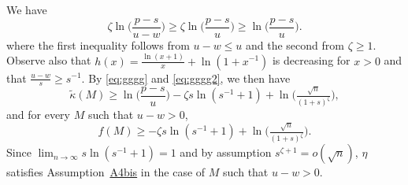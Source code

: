 \documentclass[
  12pt]{article}
\begin{document}
We have
\begin{equation}\label{eq:gggg2}
\zeta\ln\bigg(\frac{p-s}{u-w}\bigg) \geq \zeta\ln\bigg(\frac{p-s}{u}\bigg) \geq \ln\bigg(\frac{p-s}{u}\bigg).\end{equation}
where the first inequality follows from $u-w\leq u$ and the second from $\zeta\geq 1$.
Observe also that $h(x)= \frac{\ln(x+1)}{x}+\ln(1+{x}^{-1})$ is decreasing for $x>0$ and that $\frac{u-w}{s} \geq s^{-1}$. By \eqref{eq:gggg} and \eqref{eq:gggg2}, we then have 
\begin{equation*}
        \tilde{\kappa}(M) \geq \ln\big(\frac{p-s}{u}\big)-\zeta s\ln(s^{-1}+1)+ \ln \big(\tfrac{\sqrt{n}}{(1+s)^{\zeta}}\big),
\end{equation*}
and for every $M$ such that $u-w>0$,
\begin{equation}\label{eq:lowerboundb1ebic2}
        f(M) \geq -\zeta s\ln(s^{-1}+1)+ \ln \big(\tfrac{\sqrt{n}}{(1+s)^{\zeta}}\big).
\end{equation}
Since $\lim_{n\to\infty}s\ln(s^{-1}+1)=1$ and by assumption $s^{\zeta+1}=o(\sqrt{n})$, $\eta$ satisfies Assumption~\hyperlink{lab:A4bis}{A4bis} in the case of $M$ such that $u-w>0$.
\end{document}
